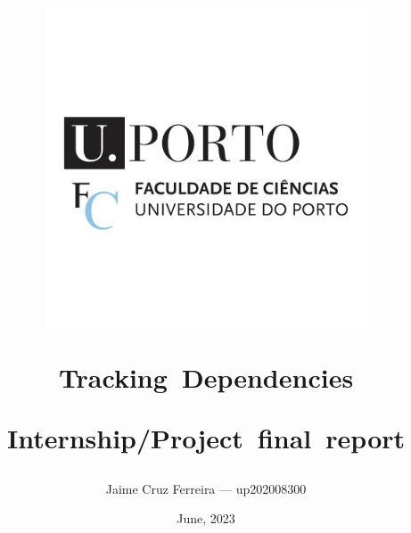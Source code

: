 \documentclass[11pt,a4paper]{report}
\begin{document}
\title{
\begin{center}
\includegraphics[width=3.75in]{images/fcuplogo.jpg}

\mbox{\textbf{Tracking Dependencies}}
\bigskip

\mbox{Internship/Project final report}
\author{Jaime Cruz Ferreira — up202008300}
\date{June, 2023}
\end{center}}

\maketitle
\tableofcontents






\end{document}
